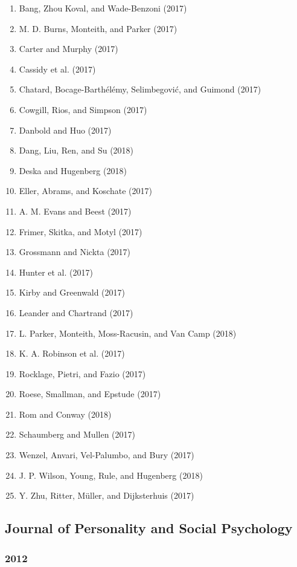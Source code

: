 \documentclass[english,man]{apa6}
\providecommand{\tightlist}{%
  \setlength{\itemsep}{0pt}\setlength{\parskip}{0pt}}
\theoremstyle{definition}
\theoremstyle{definition}
\theoremstyle{definition}
\theoremstyle{remark}
\begin{document}
\begin{enumerate}
\def\labelenumi{\arabic{enumi})}
\tightlist
\item
  Bang, Zhou Koval, and Wade-Benzoni (2017)
\item
  M. D. Burns, Monteith, and Parker (2017)
\item
  Carter and Murphy (2017)
\item
  Cassidy et al. (2017)
\item
  Chatard, Bocage-Barthélémy, Selimbegović, and Guimond (2017)
\item
  Cowgill, Rios, and Simpson (2017)
\item
  Danbold and Huo (2017)
\item
  Dang, Liu, Ren, and Su (2018)
\item
  Deska and Hugenberg (2018)
\item
  Eller, Abrams, and Koschate (2017)
\item
  A. M. Evans and Beest (2017)
\item
  Frimer, Skitka, and Motyl (2017)
\item
  Grossmann and Nickta (2017)
\item
  Hunter et al. (2017)
\item
  Kirby and Greenwald (2017)
\item
  Leander and Chartrand (2017)
\item
  L. Parker, Monteith, Moss-Racusin, and Van Camp (2018)
\item
  K. A. Robinson et al. (2017)
\item
  Rocklage, Pietri, and Fazio (2017)
\item
  Roese, Smallman, and Epstude (2017)
\item
  Rom and Conway (2018)
\item
  Schaumberg and Mullen (2017)
\item
  Wenzel, Anvari, Vel-Palumbo, and Bury (2017)
\item
  J. P. Wilson, Young, Rule, and Hugenberg (2018)
\item
  Y. Zhu, Ritter, Müller, and Dijksterhuis (2017)
\end{enumerate}

\subsection{Journal of Personality and Social
Psychology}\label{journal-of-personality-and-social-psychology}

\subsubsection{2012}\label{section-48}
\end{document}
